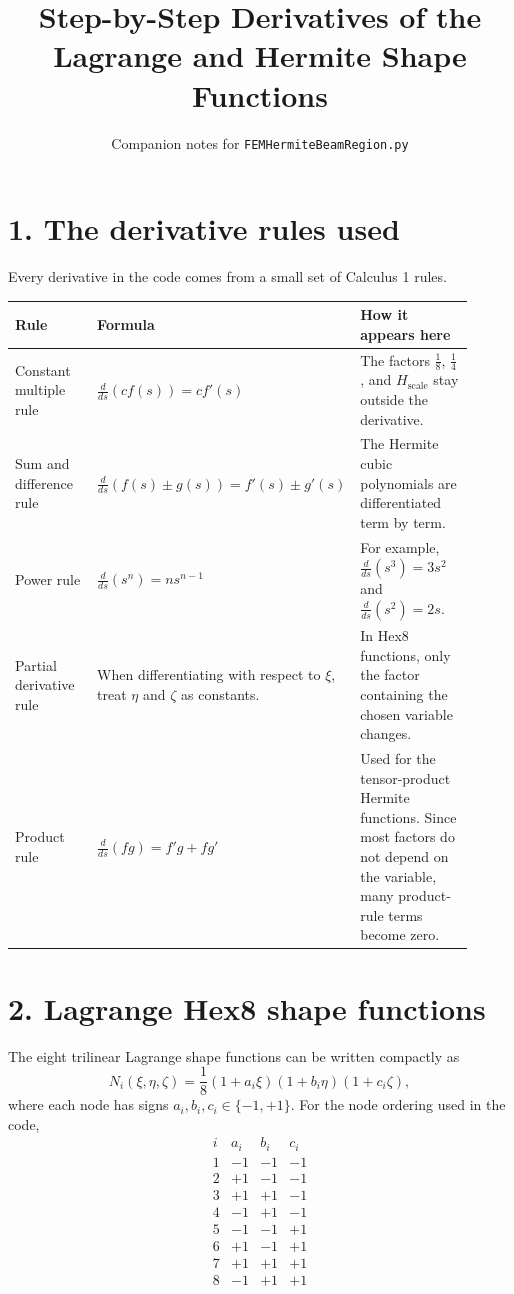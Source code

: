 \documentclass[11pt]{article}
\title{Step-by-Step Derivatives of the Lagrange and Hermite Shape Functions}
\author{Companion notes for \texttt{FEMHermiteBeamRegion.py}}
\date{}
\newcommand{\od}[2]{\frac{d #1}{d #2}}
\newcommand{\Hs}{H_{\mathrm{scale}}}
\begin{document}
\maketitle

\section*{1. The derivative rules used}

Every derivative in the code comes from a small set of Calculus 1 rules.

\begin{center}
\begin{tabular}{>{\raggedright\arraybackslash}p{0.24\linewidth}
                >{\raggedright\arraybackslash}p{0.33\linewidth}
                >{\raggedright\arraybackslash}p{0.34\linewidth}}
\toprule
\textbf{Rule} & \textbf{Formula} & \textbf{How it appears here} \\
\midrule
Constant multiple rule
& $\displaystyle \od{}{s}\left(c f(s)\right)=c f'(s)$
& The factors $\frac18$, $\frac14$, and $\Hs$ stay outside the derivative. \\
\addlinespace
Sum and difference rule
& $\displaystyle \od{}{s}\left(f(s)\pm g(s)\right)=f'(s)\pm g'(s)$
& The Hermite cubic polynomials are differentiated term by term. \\
\addlinespace
Power rule
& $\displaystyle \od{}{s}\left(s^n\right)=n s^{n-1}$
& For example, $\od{}{s}(s^3)=3s^2$ and $\od{}{s}(s^2)=2s$. \\
\addlinespace
Partial derivative rule
& When differentiating with respect to $\xi$, treat $\eta$ and $\zeta$ as constants.
& In Hex8 functions, only the factor containing the chosen variable changes. \\
\addlinespace
Product rule
& $\displaystyle \od{}{s}(fg)=f'g+fg'$
& Used for the tensor-product Hermite functions. Since most factors do not depend on the variable, many product-rule terms become zero. \\
\bottomrule
\end{tabular}
\end{center}

\section*{2. Lagrange Hex8 shape functions}

The eight trilinear Lagrange shape functions can be written compactly as
\[
N_i(\xi,\eta,\zeta)
=
\frac18
(1+a_i\xi)(1+b_i\eta)(1+c_i\zeta),
\]
where each node has signs $a_i,b_i,c_i\in\{-1,+1\}$.
For the node ordering used in the code,
\[
\begin{array}{c|ccc}
i & a_i & b_i & c_i\\
\hline
1 & -1 & -1 & -1\\
2 & +1 & -1 & -1\\
3 & +1 & +1 & -1\\
4 & -1 & +1 & -1\\
5 & -1 & -1 & +1\\
6 & +1 & -1 & +1\\
7 & +1 & +1 & +1\\
8 & -1 & +1 & +1
\end{array}
\]
\end{document}
